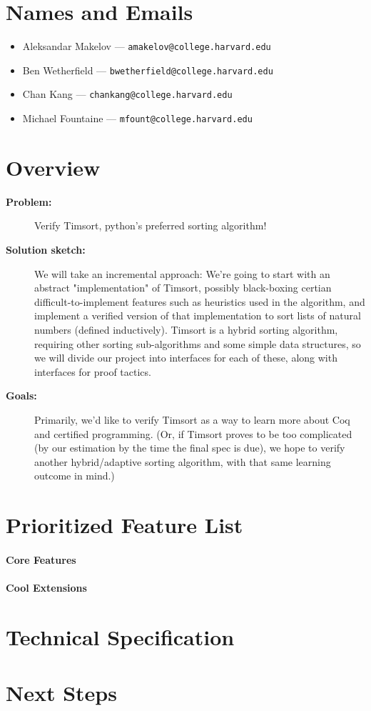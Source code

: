 \documentclass{article}
\begin{document}
\section{Names and Emails}
\begin{itemize}
  \item Aleksandar Makelov --- \texttt{amakelov@college.harvard.edu}
  \item Ben Wetherfield --- \texttt{bwetherfield@college.harvard.edu}
  \item Chan Kang --- \texttt{chankang@college.harvard.edu}
  \item Michael Fountaine --- \texttt{mfount@college.harvard.edu}
\end{itemize}

\section{Overview}
\begin{description}
  \item[\textbf{Problem:}]
    Verify Timsort, python's preferred sorting algorithm!
  \item[\textbf{Solution sketch:}]
    We will take an incremental approach:
    We're going to start with an abstract
    "implementation" of Timsort,
    possibly black-boxing certian difficult-to-implement features
    such as heuristics used in the algorithm,
    and implement a verified version of that implementation to sort
    lists of natural numbers (defined inductively).
    Timsort is a hybrid sorting
    algorithm, requiring other sorting sub-algorithms and some simple data
    structures, so we will divide our project into interfaces for each of
    these, along with interfaces for proof tactics.
  \item[\textbf{Goals:}]
    Primarily, we'd like to verify Timsort as a way to learn more about
    Coq and certified programming. (Or, if Timsort proves to be too
    complicated (by our estimation by the time the final spec is due),
    we hope to verify another hybrid/adaptive sorting algorithm,
    with that same learning outcome in mind.)
\end{description}

\section{Prioritized Feature List}
\paragraph{Core Features}
\paragraph{Cool Extensions}

\section{Technical Specification}
\section{Next Steps}
\end{document}
